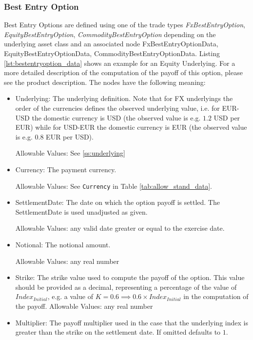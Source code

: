\subsubsection{Best Entry Option}
\label{input:bestentryoption}

Best Entry Options are defined using one of the trade types \emph{FxBestEntryOption}, \emph{EquityBestEntryOption},
\emph{CommodityBestEntryOption} depending on the underlying asset class and an associated node FxBestEntryOptionData,
EquityBestEntryOptionData, CommodityBestEntryOptionData. Listing \ref{lst:bestentryoption_data} shows an
example for an Equity Underlying. For a more detailed description of the computation of the payoff of this option, please see the product description. The nodes have the following meaning:

\begin{itemize}
\item Underlying: The underlying definition. Note that for FX underlyings the order of the currencies defines the
  observed underlying value, i.e. for EUR-USD the domestic currency is USD (the observed value is e.g. $1.2$ USD per
  EUR) while for USD-EUR the domestic currency is EUR (the observed value is e.g. $0.8$ EUR per USD).

  Allowable Values: See \ref{ss:underlying}

\item Currency: The payment currency.

  Allowable Values: See \lstinline!Currency!  in Table \ref{tab:allow_stand_data}.

\item SettlementDate: The date on which the option payoff is settled. The SettlementDate is used unadjusted
  as given. 

  Allowable Values: any valid date greater or equal to the exercise date.

\item Notional: The notional amount. 

  Allowable Values: any real number

\item Strike: The strike value used to compute the payoff of the option. This value should be provided as a decimal, representing a percentage of the value of $Index_{Initial}$, e.g. a value of $K = 0.6 \implies 0.6 \times Index_{Initial}$ in the computation of the payoff. 
  Allowable Values: any real number

\item Multiplier: The payoff multiplier used in the case that the underlying index is greater than the strike on the settlement date. If omitted defaults to $1$.


\end{itemize}
